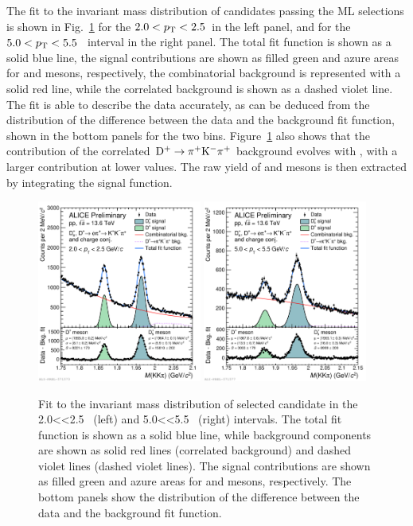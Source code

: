 The fit to the invariant mass distribution of candidates passing the ML selections is shown in Fig.~\ref{fig:new_fit} for the $2.0<p_\mathrm{T}<2.5$~\gevc in the left panel, and for the {$5.0<p_\mathrm{T}<5.5$~\gevc} interval in the right panel. The total fit function is shown as a solid blue line, the signal contributions are shown as filled green and azure areas for \dpl and \ds mesons, respectively, the combinatorial background is represented with a solid red line, while the correlated background is shown as a dashed violet line. The fit is able to describe the data accurately, as can be deduced from the distribution of the difference between the data and the background fit function, shown in the bottom panels for the two \pt bins. Figure~\ref{fig:new_fit} also shows that the contribution of the correlated $\mathrm{D^+}\rightarrow\mathrm{\pi^+K^-\pi^+}$ background evolves with \pt, with a larger contribution at lower \pt values. The raw yield of \ds and \dpl mesons is then extracted by integrating the signal function.

\begin{figure}[htb]
    \centering
    \includegraphics[width=0.48\textwidth]{Figures/Chapter 5/invmassfit_2_2p5.pdf}
    \includegraphics[width=0.48\textwidth]{Figures/Chapter 5/invmassfit_5_5p5.pdf}
    \caption{Fit to the invariant mass distribution of selected candidate in the \mbox{2.0<\pt<2.5~\gevc} (left) and \mbox{5.0<\pt<5.5~\gevc} (right) intervals. The total fit function is shown as a solid blue line, while background components are shown as solid red lines (correlated background) and dashed violet lines (dashed violet lines). The signal contributions are shown as filled green and azure areas for \dpl and \ds mesons, respectively. The bottom panels show the distribution of the difference between the data and the background fit function.}
    \label{fig:new_fit}
\end{figure}

